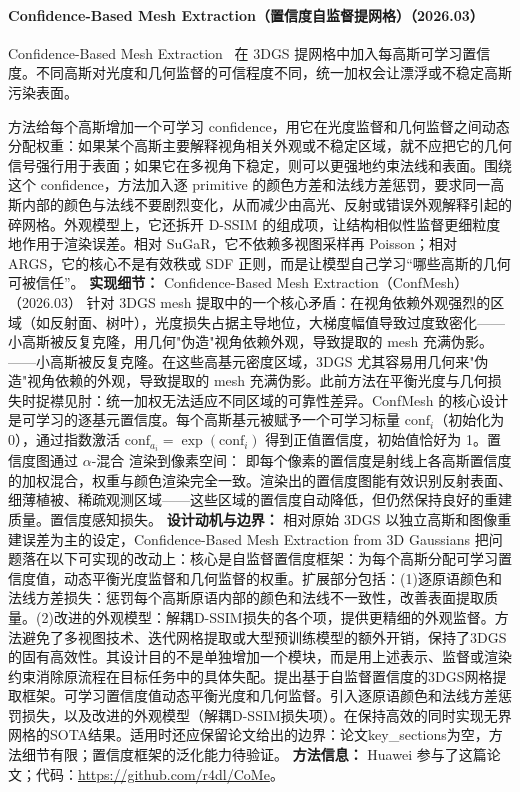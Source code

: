 \paragraph{Confidence-Based Mesh Extraction（置信度自监督提网格）（2026.03）}
Confidence-Based Mesh Extraction~\cite{2603_24725} 在 3DGS 提网格中加入每高斯可学习置信度。不同高斯对光度和几何监督的可信程度不同，统一加权会让漂浮或不稳定高斯污染表面。

方法给每个高斯增加一个可学习 confidence，用它在光度监督和几何监督之间动态分配权重：如果某个高斯主要解释视角相关外观或不稳定区域，就不应把它的几何信号强行用于表面；如果它在多视角下稳定，则可以更强地约束法线和表面。围绕这个 confidence，方法加入逐 primitive 的颜色方差和法线方差惩罚，要求同一高斯内部的颜色与法线不要剧烈变化，从而减少由高光、反射或错误外观解释引起的碎网格。外观模型上，它还拆开 D-SSIM 的组成项，让结构相似性监督更细粒度地作用于渲染误差。相对 SuGaR，它不依赖多视图采样再 Poisson；相对 ARGS，它的核心不是有效秩或 SDF 正则，而是让模型自己学习“哪些高斯的几何可被信任”。
\textbf{实现细节：} Confidence-Based Mesh Extraction（ConfMesh）（2026.03） 针对 3DGS mesh 提取中的一个核心矛盾：在视角依赖外观强烈的区域（如反射面、树叶），光度损失占据主导地位，大梯度幅值导致过度致密化——小高斯被反复克隆，用几何"伪造"视角依赖外观，导致提取的 mesh 充满伪影。——小高斯被反复克隆。在这些高基元密度区域，3DGS 尤其容易用几何来"伪造"视角依赖的外观，导致提取的 mesh 充满伪影。此前方法在平衡光度与几何损失时捉襟见肘：统一加权无法适应不同区域的可靠性差异。ConfMesh 的核心设计是可学习的逐基元置信度。每个高斯基元被赋予一个可学习标量 $\mathrm{conf}_i$（初始化为 0），通过指数激活 $\mathrm{conf}_{a_i} = \exp(\mathrm{conf}_i)$ 得到正值置信度，初始值恰好为 1。置信度图通过 $\alpha$-混合 渲染到像素空间： 即每个像素的置信度是射线上各高斯置信度的加权混合，权重与颜色渲染完全一致。渲染出的置信度图能有效识别反射表面、细薄植被、稀疏观测区域——这些区域的置信度自动降低，但仍然保持良好的重建质量。置信度感知损失。
\textbf{设计动机与边界：} 相对原始 3DGS 以独立高斯和图像重建误差为主的设定，Confidence-Based Mesh Extraction from 3D Gaussians 把问题落在以下可实现的改动上：核心是自监督置信度框架：为每个高斯分配可学习置信度值，动态平衡光度监督和几何监督的权重。扩展部分包括：(1)逐原语颜色和法线方差损失：惩罚每个高斯原语内部的颜色和法线不一致性，改善表面提取质量。(2)改进的外观模型：解耦D-SSIM损失的各个项，提供更精细的外观监督。方法避免了多视图技术、迭代网格提取或大型预训练模型的额外开销，保持了3DGS的固有高效性。其设计目的不是单独增加一个模块，而是用上述表示、监督或渲染约束消除原流程在目标任务中的具体失配。提出基于自监督置信度的3DGS网格提取框架。可学习置信度值动态平衡光度和几何监督。引入逐原语颜色和法线方差惩罚损失，以及改进的外观模型（解耦D-SSIM损失项）。在保持高效的同时实现无界网格的SOTA结果。适用时还应保留论文给出的边界：论文key\_sections为空，方法细节有限；置信度框架的泛化能力待验证。
\textbf{方法信息：} Huawei 参与了这篇论文；代码：\url{https://github.com/r4dl/CoMe}。



